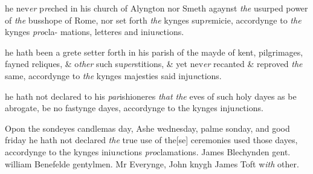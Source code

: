 \documentclass[12pt, a4paper]{book}
\begin{document}
            	
				\marginpar[\vspace{0.5cm}{\textcolor{Gray}{n}}]{}
			
            	
		\ifthenelse{\isodd{\thepage}}
		{\reversemarginpar}
		{\normalmarginpar}
		he nev\textit{er} p\textit{re}ched in his church of Alyngton nor Smeth
 agaynst \textit{the} usurped power of \textit{the} busshope of Rome, nor
 set forth \textit{the} kynges sup\textit{re}micie, accordynge to \textit{the} kynges \textit{pro}cla-
mations, letteres and iniu\textit{n}ctions.
               
            	
				\marginpar[\vspace{0.5cm}{\textcolor{Gray}{pilgrimages}}]{}
			
		\ifthenelse{\isodd{\thepage}}
		{\reversemarginpar}
		{\normalmarginpar}
		 he hath been a grete setter forth in his parish
			 of the mayde of kent,
 pilgrimages, fayned reliques, \& o\textit{ther} such su\textit{per}stitions, \& yet
 nev\textit{er} recanted \& reproved \textit{the} same, accordynge to \textit{the} kynges
            		majesties said inju\textit{n}ctions.
            	
            	
			
            		
		\ifthenelse{\isodd{\thepage}}
		{\reversemarginpar}
		{\normalmarginpar}
		he hath not declared to his \textit{par}ishioneres \textit{that the} eves of
 such holy dayes as be abrogate, be no fastynge dayes,
 accordynge to the kynges inju\textit{n}ctions.
            	
            	
				\marginpar[\vspace{0.5cm}{\textcolor{Gray}{ceremonies}}]{}
			
            		
		\ifthenelse{\isodd{\thepage}}
		{\reversemarginpar}
		{\normalmarginpar}
		Opon the sondeyes
			 candlemas day, Ashe wednesday, palme sonday,
            			and good friday he hath not declared \textit{the} true use of the[se]
 ceremonies used those dayes, accordynge to the kynges
 iniu\textit{n}ctions \textit{pro}clamations. James Blechynden gent.
            			william Benefelde gentylmen. Mr Everynge, John knygh
            			James Toft w\textit{ith} other.
            	
\end{document}

